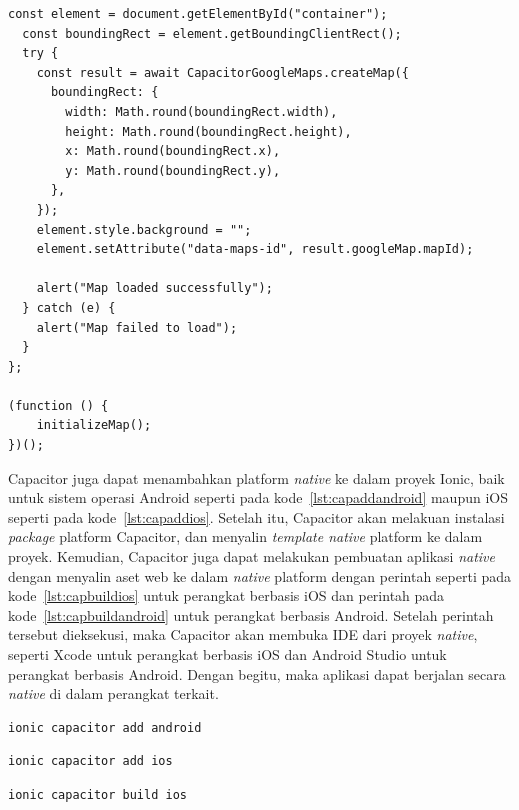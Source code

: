 \begin{enumerate}
\begin{lstlisting}[label={lst:codeGmapsPlugin}, caption=Contoh Kode Penggunaan \textit{Plugin} Google Maps]
  const element = document.getElementById("container");
  const boundingRect = element.getBoundingClientRect();
  try {
    const result = await CapacitorGoogleMaps.createMap({
      boundingRect: {
        width: Math.round(boundingRect.width),
        height: Math.round(boundingRect.height),
        x: Math.round(boundingRect.x),
        y: Math.round(boundingRect.y),
      },
    });
    element.style.background = "";
    element.setAttribute("data-maps-id", result.googleMap.mapId);

    alert("Map loaded successfully");
  } catch (e) {
    alert("Map failed to load");
  }
};

(function () {
	initializeMap();
})();
\end{lstlisting}
	
\end{enumerate}

Capacitor juga dapat menambahkan platform \textit{native} ke dalam proyek Ionic, baik untuk sistem operasi Android seperti pada kode~\ref{lst:capaddandroid} maupun iOS seperti pada kode~\ref{lst:capaddios}. Setelah itu, Capacitor akan melakuan instalasi \textit{package} platform Capacitor, dan menyalin \textit{template native} platform ke dalam proyek. Kemudian, Capacitor juga dapat melakukan pembuatan aplikasi \textit{native} dengan menyalin aset web ke dalam \textit{native} platform dengan perintah seperti pada kode~\ref{lst:capbuildios} untuk perangkat berbasis iOS dan perintah pada kode~\ref{lst:capbuildandroid} untuk perangkat berbasis Android. Setelah perintah tersebut dieksekusi, maka Capacitor akan membuka IDE dari proyek \textit{native}, seperti Xcode untuk perangkat berbasis iOS dan Android Studio untuk perangkat berbasis Android.  Dengan begitu, maka aplikasi dapat berjalan secara \textit{native} di dalam perangkat terkait. 

\begin{lstlisting}[label={lst:capaddandroid}, caption=Kode untuk Menambahkan Platform Android dengan Capacitor]
ionic capacitor add android
\end{lstlisting}

\begin{lstlisting}[label={lst:capaddios}, caption=Kode untuk Menambahkan Platform iOS dengan Capacitor]
ionic capacitor add ios
\end{lstlisting}

\begin{lstlisting}[label={lst:capbuildios}, caption=Kode untuk Membuat Aplikasi Capacitor Untuk Perangkat iOS]
ionic capacitor build ios
\end{lstlisting}

